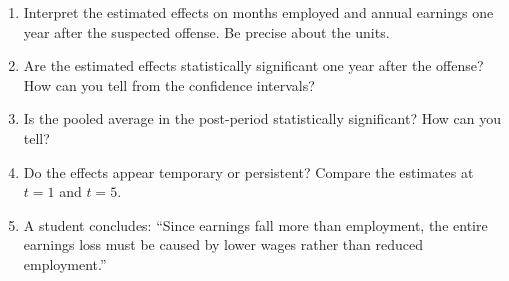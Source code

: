 \documentclass[11pt]{article}
\begin{document}
\begin{enumerate}[resume]
\begin{enumerate}[label=(\alph*)]
\item Interpret the estimated effects on months employed
and annual earnings one year after the suspected offense.
Be precise about the units.
\vspace{2cm}
%
%

\item Are the estimated effects statistically significant
one year after the offense? How can you tell from
the confidence intervals?
\vspace{2cm}


\item Is the pooled average in the post-period statistically significant? How can you tell?
\vspace{2cm}


\item Do the effects appear temporary or persistent?
Compare the estimates at $t=1$ and $t=5$.
\vspace{2cm}

\item A student concludes:
``Since earnings fall more than employment, the entire
earnings loss must be caused by lower wages rather than
reduced employment.''


\end{enumerate}
\end{enumerate}
\end{document}

